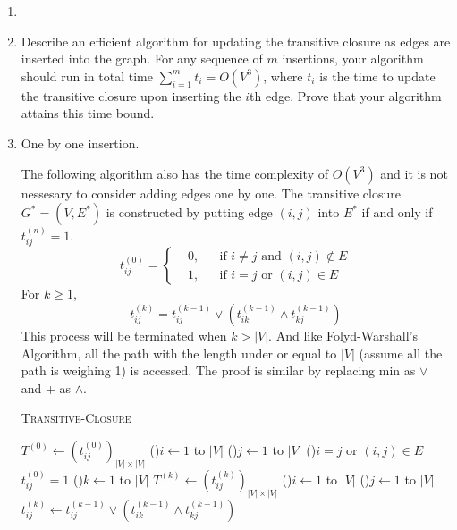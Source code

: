 \documentclass[12pt,a4paper]{article}
\makeatletter
\newtheorem*{solution}{Solution}
\theoremstyle{definition}
\renewenvironment{solution}[1][Solution] {\par\pushQED{\qed}\normalfont\topsep6\p@\@plus6\p@\relax\trivlist\item[\hskip\labelsep\bfseries#1\@addpunct{.}]\ignorespaces}{\popQED\endtrivlist\@endpefalse} \makeatother
\makeatother
\begin{document}
\begin{enumerate}
\begin{enumerate}
\begin{solution}
		\end{solution}
	    \item Describe an efficient algorithm for updating the transitive closure as edges are inserted into the graph. For any sequence of $m$ insertions, your algorithm should run in total time $\sum_{i=1}^m t_i=O(V^3)$, where $t_i$ is the time to update the transitive closure upon inserting the $i$th edge. Prove that your algorithm attains this time bound.
	    \begin{solution}
			One by one insertion.

			\begin{tcolorbox}[skin=mycross]
			The following algorithm also has the time complexity of $O(V^3)$ and it is not nessesary to consider adding edges one by one. The transitive closure $G^*=(V,E^*)$ is constructed by putting edge $(i,j)$ into $E^*$ if and only if $t_{ij}^{(n)}=1$.
			\begin{equation*}
				t_{ij}^{(0)} = \left\{\begin{aligned}
					&0, &&\text{if }i\neq j\text{ and }(i,j)\not\in E\\
					&1, &&\text{if }i = j\text{ or }(i,j)\in E
				\end{aligned}\right.
			\end{equation*}
			For $k\geq 1$,
			\begin{equation*}
				t_{ij}^{(k)}=t_{ij}^{(k-1)}\vee \left(t_{ik}^{(k-1)}\land t_{kj}^{(k-1)}\right)
			\end{equation*}
			This process will be terminated when $k>|V|$. And like Folyd-Warshall's Algorithm, all the path with the length under or equal to $|V|$ (assume all the path is weighing 1) is accessed. The proof is similar by replacing min as $\vee$ and + as $\land$. 
			\begin{algorithm}[H]
				\caption{\textsc{Transitive-Closure}}
				\label{alg:tc}
				\BlankLine
				$T^{(0)}\leftarrow (t_{ij}^{(0)})_{|V|\times|V|}$\;
				\For(){$i\leftarrow 1$ to $|V|$}{
					\For(){$j\leftarrow 1$ to $|V|$}{
						\If(){$i=j$ or $(i,j)\in E$}{
							$t_{ij}^{(0)}=1$\;
						}
					}
				}
				\For(){$k\leftarrow 1$ to $|V|$}{
					$T^{(k)}\leftarrow (t_{ij}^{(k)})_{|V|\times |V|}$\;
					\For(){$i\leftarrow 1$ to $|V|$}{
						\For(){$j\leftarrow 1$ to $|V|$}{
							$t_{ij}^{(k)}\leftarrow t_{ij}^{(k-1)}\vee \left(t_{ik}^{(k-1)}\land t_{kj}^{(k-1)}\right)$\;
						}
					}
				}
				\;
			\end{algorithm}


\end{tcolorbox}
\end{solution}
\end{enumerate}
\end{enumerate}
\end{document}
